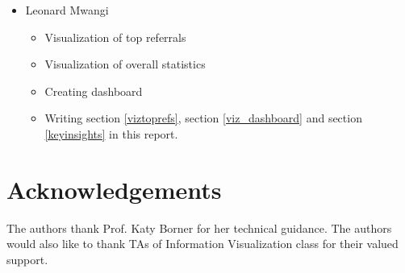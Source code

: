 \documentclass[sigconf]{acmart}
\begin{document}
\begin{itemize}
\item Leonard Mwangi
    \begin{itemize}
    \item Visualization of top referrals
    \item Visualization of overall statistics
    \item Creating dashboard
    \item Writing section \ref{viztoprefs}, section \ref{viz_dashboard} and
    section \ref{keyinsights} in this report.
    \end{itemize}

\end{itemize}


\section{Acknowledgements}
 The authors thank Prof. Katy Borner for her technical guidance. The
 authors would also like to thank TAs of Information Visualization class for their valued
 support.



 
\end{document}

